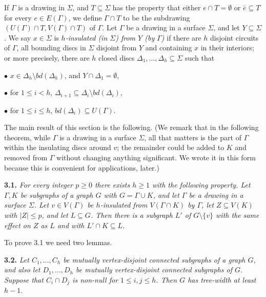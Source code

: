If $\Gamma$ is a drawing in $\Sigma$, and $T \subseteq \Sigma$ has the property that either $e \cap T = \emptyset$ or $\bar{e} \subseteq T$ for every $e \in E(\Gamma)$, we define $\Gamma \cap T$ to be the subdrawing $(U(\Gamma) \cap T, V(\Gamma) \cap T)$ of $\Gamma$. Let $\Gamma$ be a drawing in a surface $\Sigma$, and let $Y \subseteq \Sigma$. We say $x \in \Sigma$ is \textit{$h$-insulated (in $\Sigma$) from $Y$ (by $\Gamma$)} if there are $h$ disjoint circuits of $\Gamma$, all bounding discs in $\Sigma$ disjoint from $Y$ and containing $x$ in their interiors; or more precisely, there are $h$ closed discs $\Delta_1, \ldots, \Delta_h \subseteq \Sigma$ such that

\hspace*{12pt}$\bullet$ $x \in \Delta_h \setminus bd(\Delta_h)$, and $Y \cap \Delta_1 = \emptyset$,

\hspace*{12pt}$\bullet$ for $1 \le i < h$, $\Delta_{i+1} \subseteq \Delta_i \setminus bd(\Delta_i)$,

\hspace*{12pt}$\bullet$ for $1 \le i \le h$, $bd(\Delta_i) \subseteq U(\Gamma)$.

The main result of this section is the following. (We remark that in the following theorem, while $\Gamma$ is a drawing in a surface $\Sigma$, all that matters is the part of $\Gamma$ within the insulating discs around $v$; the remainder could be added to $K$ and removed from $\Gamma$ without changing anything significant. We wrote it in this form because this is convenient for applications, later.)

\textbf{3.1.} \textit{For every integer $p \ge 0$ there exists $h \ge 1$ with the following property. Let $\Gamma, K$ be subgraphs of a graph $G$ with $G = \Gamma \cup K$, and let $\Gamma$ be a drawing in a surface $\Sigma$. Let $v \in V(\Gamma)$ be $h$-insulated from $V(\Gamma \cap K)$ by $\Gamma$, let $Z \subseteq V(K)$ with $|Z| \le p$, and let $L \subseteq G$. Then there is a subgraph $L'$ of $G \setminus \{v\}$ with the same effect on $Z$ as $L$ and with $L' \cap K \subseteq L$.}

To prove 3.1 we need two lemmas.

\textbf{3.2.} \textit{Let $C_1, \ldots, C_h$ be mutually vertex-disjoint connected subgraphs of a graph $G$, and also let $D_1, \ldots, D_h$ be mutually vertex-disjoint connected subgraphs of $G$. Suppose that $C_i \cap D_j$ is non-null for $1 \le i, j \le h$. Then $G$ has tree-width at least $h - 1$.}
